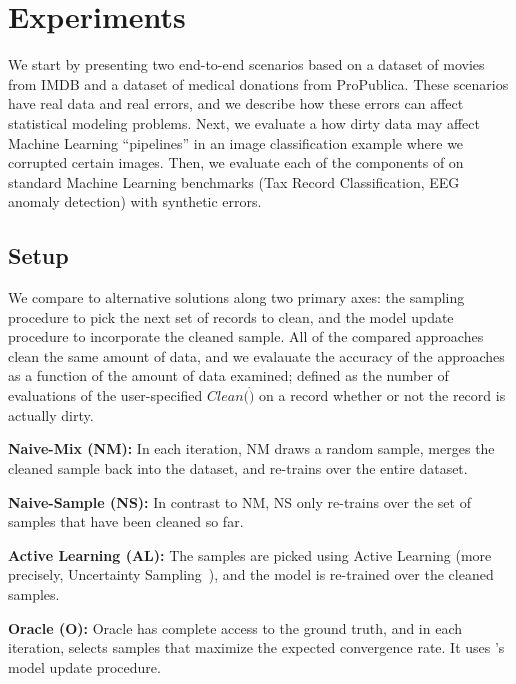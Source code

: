 \section{Experiments}\label{eval}
We start by presenting two end-to-end scenarios based on a dataset of movies from IMDB and a dataset of medical donations from ProPublica.
These scenarios have real data and real errors, and we describe how these errors can affect statistical modeling problems.
Next, we evaluate a how dirty data may affect Machine Learning ``pipelines'' in an image classification example where we corrupted certain images.
Then, we evaluate each of the components of \sys on standard Machine Learning benchmarks (Tax Record Classification, EEG anomaly detection) with synthetic errors.

\subsection{Setup}
We compare \sys to alternative solutions along two primary axes: the sampling procedure to pick the next set of records to clean, and the model update procedure to incorporate the cleaned sample.
All of the compared approaches clean the same amount of data, and we evalauate the accuracy of the approaches as a function of the amount of data examined; defined as the number of evaluations of the user-specified $Clean(\dot)$ on a record whether or not the record is actually dirty.

\vspace{0.25em}
\noindent\textbf{Naive-Mix (NM): } In each iteration, NM draws a random sample, merges the cleaned sample back into the dataset, and re-trains over the entire dataset.

\vspace{0.25em}
\noindent\textbf{Naive-Sample (NS): } In contrast to NM, NS only re-trains over the set of samples that have been cleaned so far.

\vspace{0.25em}
\noindent\textbf{Active Learning (AL): }
The samples are picked using Active Learning (more precisely, Uncertainty Sampling~\cite{settles2010active}), and the model is re-trained over the cleaned samples.

\vspace{0.25em}
\noindent\textbf{Oracle (O): } Oracle has complete access to the ground truth, and in each iteration, selects samples that maximize the expected convergence rate.  It uses \sys's model update procedure.  

